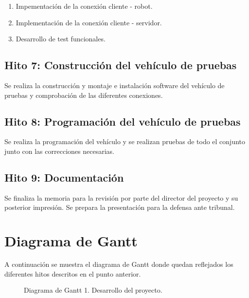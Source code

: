 \begin{enumerate}
 \item Impementación de la conexión cliente - robot.
 \item Implementación de la conexión cliente - servidor.
 \item Desarrollo de test funcionales.
\end{enumerate}


\subsection{Hito 7: Construcción del vehículo de pruebas }
\label{subsec:hito6}

Se realiza la construcción y montaje e instalación software del vehículo de pruebas y comprobación de las diferentes conexiones.

\subsection{Hito 8: Programación del vehículo de pruebas }
\label{subsec:hito6}

Se realiza la programación del vehículo y se realizan pruebas de todo el conjunto junto con las correcciones necesarias.


\subsection{Hito 9: Documentación }
\label{subsec:hito6}

Se finaliza la memoria para la revisión por parte del director del proyecto y su posterior impresión. Se prepara la presentación para la defensa ante tribunal.


\section{Diagrama de Gantt}

A continuación se muestra el diagrama de Gantt donde quedan reflejados los diferentes hitos descritos en el punto anterior.

\begin{figure}
  \caption{Diagrama de Gantt 1. Desarrollo del proyecto.}
\end{figure}

